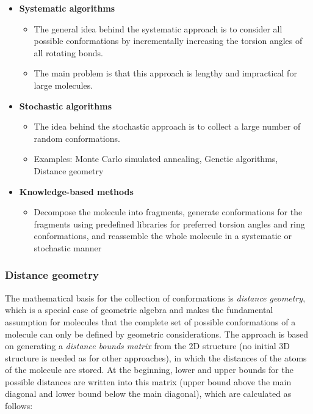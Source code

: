 \begin{itemize}
    \item \textbf{Systematic algorithms}
    \begin{itemize}
        \item The general idea behind the systematic approach is to consider all possible conformations by incrementally increasing the torsion angles of all rotating bonds.
        \item The main problem is that this approach is lengthy and impractical for large molecules.
    \end{itemize}
    \item \textbf{Stochastic algorithms}
    \begin{itemize}
        \item The idea behind the stochastic approach is to collect a large number of random conformations. 
        \item Examples: Monte Carlo simulated annealing, Genetic algorithms, Distance geometry
    \end{itemize}
    \item \textbf{Knowledge-based methods}
    \begin{itemize}
        \item Decompose the molecule into fragments, generate conformations for the fragments using predefined libraries for preferred torsion angles and ring conformations, and reassemble the whole molecule in a systematic or stochastic manner
    \end{itemize}
\end{itemize}

\subsubsection{Distance geometry}

The mathematical basis for the collection of conformations is \emph{distance geometry}, which is a special case of geometric algebra and makes the fundamental assumption for molecules that the complete set of possible conformations of a molecule can only be defined by geometric considerations. The approach is based on generating a \emph{distance bounds matrix} from the 2D structure (no initial 3D structure is needed as for other approaches), in which the distances of the atoms of the molecule are stored. At the beginning, lower and upper bounds for the possible distances are written into this matrix (upper bound above the main diagonal and lower bound below the main diagonal), which are calculated as follows:

